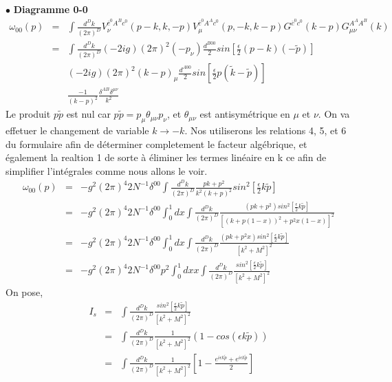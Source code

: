 \documentclass[a4paper,11pt]{article} %
\theoremstyle{plain}
\theoremstyle{definition}
\theoremstyle{remark}
\numberwithin{equation}{section}
\numberwithin{equation}{subsection}
\numberwithin{figure}{section}
\begin{document}
$\bullet$ \textbf{ Diagramme 0-0 }
 \begin{eqnarray*}
 \omega_{00}(p) &=&  \int  \frac{d^D k}{(2 \pi)^D}
V_{\nu}^{ \overline{c}^{0} A^{B} c^{0} } (p-k , k , -p )
V_{\mu}^{ \overline{c}^{0} A^{A} c^{0} } (p,-k,k-p )
G^{ \overline{c}^{0} c^{0} } (k-p)
G^{ A^{A} A^{B} }_{\mu \nu } (k)  \\
                              &=&  \int  \frac{d^D k}{(2 \pi)^D}
( -2ig) (2 \pi)^2  (-p_{\nu} )  \frac{d^{B00}}{2} sin \left[ \frac{\epsilon}{2}  (p-k) (- \tilde{p} ) \right]            \\
&&        ( -2ig) (2 \pi)^2 (k-p)_{\mu}   \frac{d^{A00}}{2} sin \left[ \frac{\epsilon}{2}  p ( \tilde{k} - \tilde{p} ) \right]              \\
&&         \frac{-1}{(k-p)^2}
\frac{\delta^{AB} \delta^{\mu \nu}}{k^2}
\end{eqnarray*}
Le produit $p \tilde{p} $ est nul car $p \tilde{p} = p_{\mu} \theta_{\mu \nu} p_{\nu} $, et $\theta_{\mu \nu}$ est antisymétrique en $\mu$ et $\nu$. On va effetuer le changement de variable $k \rightarrow -k$. Nos utiliserons les relations 4, 5, et 6 du formulaire afin de déterminer completement le facteur algébrique, et également la realtion 1 de sorte à éliminer les termes linéaire en k ce afin de simplifier l'intégrales comme nous allons le voir.
\begin{eqnarray*}
 \omega_{00}(p)  &=&  - g^2  (2 \pi)^4  2N^{-1}  \delta^{00}
\int  \frac{d^D k}{(2 \pi)^D}
\frac{pk + p^2}{k^2(k+p)^2}
sin^2 \left[ \frac{\epsilon}{2} k \tilde{p} \right]  \\
                              &=&  - g^2  (2 \pi)^4  2N^{-1}   \delta^{00}
\int_{0}^{1}  dx
\int  \frac{d^D k}{(2 \pi)^D}
\frac{(pk + p^2)  sin^2 \left[ \frac{\epsilon}{2} k \tilde{p} \right] }{\left[ (k+p(1-x))^2  +  p^2 x(1-x) \right]^2}  \\
                              &=&  - g^2  (2 \pi)^4  2N^{-1}    \delta^{00}
\int_{0}^{1}  dx
\int  \frac{d^D k}{(2 \pi)^D}
\frac{(pk + p^2 x)  sin^2 \left[ \frac{\epsilon}{2} k \tilde{p} \right] }{\left[ k^2  +  M^2 \right]^2}  \\
                              &=&  - g^2  (2 \pi)^4  2N^{-1}    \delta^{00} p^{2}
\int_{0}^{1}  dx x
\int  \frac{d^D k}{(2 \pi)^D}
\frac{sin^2 \left[ \frac{\epsilon}{2} k \tilde{p} \right] }{\left[ k^2  +  M^2 \right]^2}  
\end{eqnarray*}
On pose,
\begin{eqnarray*}
 I_{s} &=& \int  \frac{d^D k}{(2 \pi)^D}
\frac{sin^2 \left[ \frac{\epsilon}{2} k \tilde{p} \right] }{\left[ k^2  +  M^2  \right]^2}  \\
       &=&  \int  \frac{d^D k}{(2 \pi)^D}
\frac{1}{\left[ k^2  +  M^2 \right]^2} 
 \left( 1 - cos ( \epsilon k \tilde{p} ) \right) \\
                              &=&  \int  \frac{d^D k}{(2 \pi)^D}
\frac{1 }{\left[ k^2  +  M^2 \right]^2} 
 \left[ 1 - \frac{e^{ i \epsilon k \tilde{p} }   +   e^{i \epsilon k \tilde{p} } }{ 2 }  \right]
\end{eqnarray*}
\end{document}

